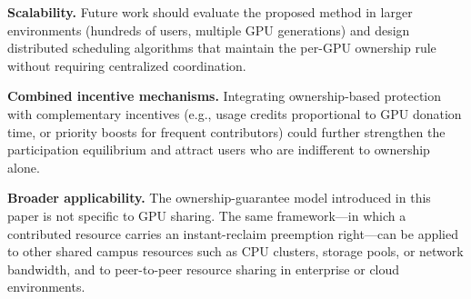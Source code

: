 
\textbf{Scalability.}
Future work should evaluate the proposed method in larger environments
(hundreds of users, multiple GPU generations) and design distributed
scheduling algorithms that maintain the per-GPU ownership rule
without requiring centralized coordination.


\textbf{Combined incentive mechanisms.}
Integrating ownership-based protection with complementary incentives
(e.g., usage credits proportional to GPU donation time, or
priority boosts for frequent contributors) could further strengthen
the participation equilibrium and attract users who are indifferent
to ownership alone.


\textbf{Broader applicability.}
The ownership-guarantee model introduced in this paper is not specific
to GPU sharing.
The same framework---in which a contributed resource carries an
instant-reclaim preemption right---can be applied to other shared campus
resources such as CPU clusters, storage pools, or network bandwidth,
and to peer-to-peer resource sharing in enterprise or cloud environments.

